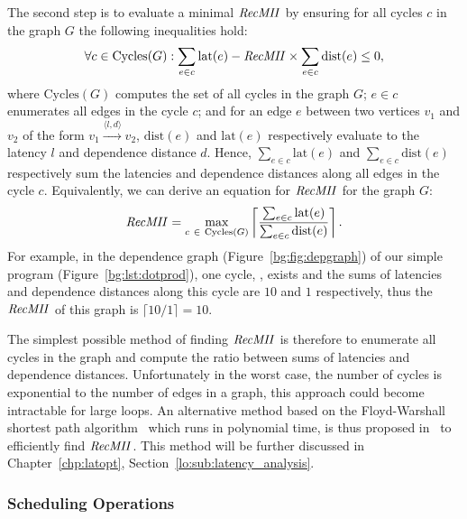 The second step is to evaluate a minimal $\mathit{RecMII}$ by ensuring for all cycles
$c$ in the graph $G$ the following inequalities hold:
\begin{equation}
    \forall c \in \mathrm{Cycles}(G):
        \sum_{e \in c} \mathrm{lat}(e) - \mathit{RecMII} \times
        \sum_{e \in c} \mathrm{dist}(e) \leq 0,
\end{equation}
where $\mathrm{Cycles}(G)$ computes the set of all cycles in the graph $G$;
$e \in c$ enumerates all edges in the cycle $c$; and for an edge $e$ between
two vertices $v_1$ and $v_2$ of the form $v_1 \xrightarrow{\langle l, d
\rangle} v_2$, $\mathrm{dist}(e)$ and $\mathrm{lat}(e)$ respectively evaluate
to the latency $l$ and dependence distance $d$.  Hence, $\sum_{e \in c}
\mathrm{lat}(e)$ and $\sum_{e \in c} \mathrm{dist}(e)$ respectively sum
the latencies and dependence distances along all edges in the cycle $c$.
Equivalently, we can derive an equation for $\mathit{RecMII}$ for the graph $G$:
\begin{equation}
    \RecMII = \max_{c~\in~\mathrm{Cycles}(G)}
        \left\lceil \frac{%
            \sum_{e \in c} \mathrm{lat}(e)
        }{%
            \sum_{e \in c} \mathrm{dist}(e)
        }
        \right\rceil.
\end{equation}
For example, in the dependence graph (Figure~\ref{bg:fig:depgraph}) of our
simple program (Figure~\ref{bg:lst:dotprod}), one cycle,
,
exists and the sums of latencies and dependence distances along this cycle are
$10$ and $1$ respectively, thus the $\mathit{RecMII}$ of this graph is $\lceil 10 / 1
\rceil = 10$.

The simplest possible method of finding $\mathit{RecMII}$ is therefore to enumerate
all cycles in the graph and compute the ratio between sums of latencies
and dependence distances.  Unfortunately in the worst case, the number of
cycles is exponential to the number of edges in a graph, this approach
could become intractable for large loops.  An alternative method based
on the Floyd-Warshall shortest path algorithm~\cite{floyd62} which runs
in polynomial time, is thus proposed in~\cite{rau94} to efficiently find
$\mathit{RecMII}$.  This method will be further discussed in Chapter~\ref{chp:latopt},
Section~\ref{lo:sub:latency_analysis}.

\subsubsection{Scheduling Operations}

